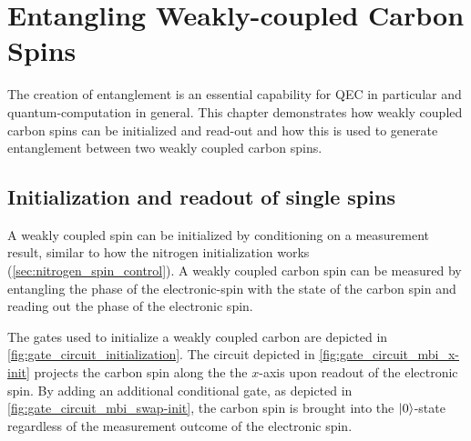 \chapter{Entangling Weakly-coupled Carbon Spins}
\label{chap:control_weakly_carbon}
The creation of entanglement is an essential capability for QEC in particular and quantum-computation in general.
This chapter demonstrates how weakly coupled carbon spins can be initialized and read-out and how this is used to generate entanglement between two weakly coupled carbon spins.

\section{Initialization and readout of single spins}
\label{sec:carbon_init_and_readout}
A weakly coupled spin can be initialized by conditioning on a measurement result, similar to how the nitrogen initialization works (\cref{sec:nitrogen_spin_control}).
A weakly coupled carbon spin can be measured by entangling the phase of the electronic-spin with the state of the carbon spin and reading out the phase of the electronic spin.

The gates used to initialize a weakly coupled carbon are depicted in \cref{fig:gate_circuit_initialization}.
The circuit depicted in \cref{fig:gate_circuit_mbi_x-init} projects the carbon spin along the the $x$-axis upon readout of the electronic spin.
By adding an additional conditional gate, as depicted in \cref{fig:gate_circuit_mbi_swap-init}, the carbon spin is brought into the ${\left\vert{0}\right\rangle}$-state regardless of the measurement outcome of the electronic spin.

